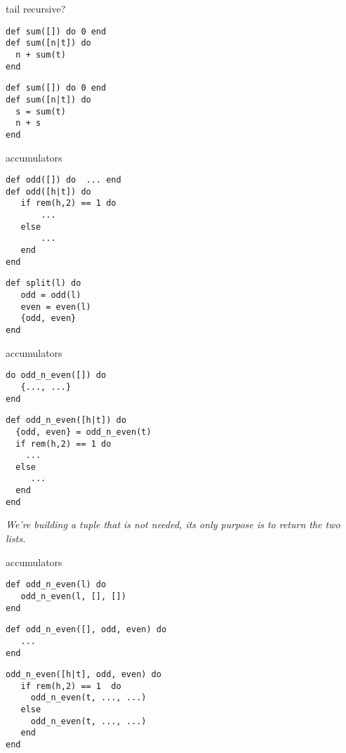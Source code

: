 \begin{frame}[fragile]{tail recursive?}

\begin{verbatim}
def sum([]) do 0 end
def sum([n|t]) do 
  n + sum(t) 
end
\end{verbatim}

\pause
\begin{verbatim}
def sum([]) do 0 end
def sum([n|t]) do 
  s = sum(t)
  n + s
end
\end{verbatim}

\end{frame}

\begin{frame}[fragile]{accumulators}

\begin{verbatim}
def odd([]) do  ... end
def odd([h|t]) do
   if rem(h,2) == 1 do
       ... 
   else 
       ...
   end
end
\end{verbatim}
\pause

\begin{verbatim}
def split(l) do
   odd = odd(l)
   even = even(l)
   {odd, even}
end
\end{verbatim}
\end{frame}

\begin{frame}[fragile]{accumulators}

\begin{verbatim}
do odd_n_even([]) do
   {..., ...}
end
\end{verbatim}
\pause
\begin{verbatim}
def odd_n_even([h|t]) do
  {odd, even} = odd_n_even(t)
  if rem(h,2) == 1 do
    ...
  else 
     ...
  end
end
\end{verbatim}

\vspace{40pt}
{\em We're building a tuple that is not needed, its only purpose is to return the two lists.}

\end{frame}


\begin{frame}[fragile]{accumulators}

\pause
\begin{verbatim}
def odd_n_even(l) do 
   odd_n_even(l, [], [])
end
\end{verbatim}

\pause
\begin{verbatim}
def odd_n_even([], odd, even) do
   ...
end
\end{verbatim}
\pause
\begin{verbatim}
odd_n_even([h|t], odd, even) do
   if rem(h,2) == 1  do 
     odd_n_even(t, ..., ...)
   else
     odd_n_even(t, ..., ...) 
   end
end
\end{verbatim}

\end{frame}

